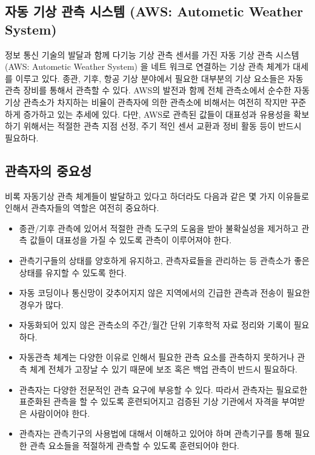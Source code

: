 \subsection{자동 기상 관측 시스템 (AWS: Autometic Weather System)}

정보 통신 기술의 발달과 함께 다기능 기상 관측 센서를 가진 자동 기상 관측 시스템 (AWS: Autometic Weather System) 을 네트 워크로 연결하는 기상 관측 체계가 대세를 이루고 있다. 종관, 기후, 항공 기상 분야에서 필요한 대부분의 기상 요소들은 자동 관측 장비를 통해서 관측할 수 있다. AWS의 발전과 함께 전체 관측소에서 순수한 자동기상 관측소가 차지하는 비율이 관측자에 의한 관측소에 비해서는 여전히 작지만 꾸준하게 증가하고 있는 추세에 있다. 다만, AWS로 관측된 값들이 대표성과 유용성을 확보하기 위해서는 적절한 관측 지점 선정, 주기 적인 센서 교환과 정비 활동 등이 반드시 필요하다.

\subsection{관측자의 중요성}
비록 자동기상 관측 체계들이 발달하고 있다고 하더라도 다음과 같은 몇 가지 이유들로 인해서 관측자들의 역할은 여전히 중요하다.

\begin{itemize}
	\item 종관/기후 관측에 있어서 적절한 관측 도구의 도움을 받아 불확실성을 제거하고 관측 값들이 대표성을 가질 수 있도록 관측이 이루어져야 한다.
	\item 관측기구들의 상태를 양호하게 유지하고, 관측자료들을 관리하는 등 관측소가 좋은 상태를 유지할 수 있도록 한다.
	\item 자동 코딩이나 통신망이 갖추어지지 않은 지역에서의 긴급한 관측과 전송이 필요한 경우가 많다.
	\item 자동화되어 있지 않은 관측소의 주간/월간 단위 기후학적 자료 정리와 기록이 필요하다.
	\item 자동관측 체계는 다양한 이유로 인해서 필요한 관측 요소를 관측하지 못하거나 관측 체계 전체가 고장날 수 있기 때문에 보조 혹은 백업 관측이 반드시 필요하다.
	\item 관측자는 다양한 전문적인 관측 요구에 부응할 수 있다. 따라서 관측자는 필요로한 표준화된 관측을 할 수 있도록 훈련되어지고 검증된 기상 기관에서 자격을 부여받은 사람이어야 한다. 
	\item 관측자는 관측기구의 사용법에 대해서 이해하고 있어야 하며 관측기구를 통해 필요한 관측 요소들을 적절하게 관측할 수 있도록 훈련되어야 한다.
\end{itemize}
	
